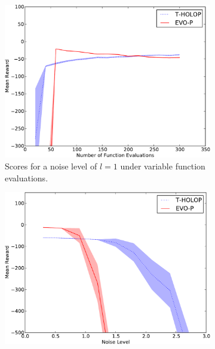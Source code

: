\documentclass[conference]{IEEEtran}
\begin{document}
\begin{figure}[ht]



  \centering
        \begin{subfigure}[b]{0.32\textwidth}
                \centering
                \includegraphics[width=1.0\textwidth]{graphics/online-IP-crop.pdf}
                \caption{Scores for a noise level of $l=1$ under variable function evaluations. }
                \label{fig:IP}
        \end{subfigure}   \begin{subfigure}[b]{0.32\textwidth}
                \centering
                \includegraphics[width=1.0\textwidth]{graphics/online-noise-IP_50-crop.pdf}

\end{subfigure}
\end{figure}
\end{document}

